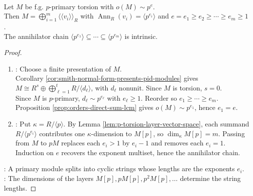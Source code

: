 \begin{theorem} \label{thm:cyclic-decomposition-primary-pid} \\
Let $M$ be f.g. $p$-primary torsion with $o(M)\sim p^e$.\\
Then $M=\bigoplus\limits_{i=1}^m\langle\!\langle v_i\rangle\!\rangle_R$ with $\operatorname{Ann}_R(v_i)=\langle p^{e_i}\rangle$ and $e=e_1\geq e_2\geq\cdots\geq e_m\geq1$.\\
The annihilator chain $\langle p^{e_1}\rangle\subseteq\cdots\subseteq\langle p^{e_m}\rangle$ is intrinsic.
\begin{proof}
\begin{enumerate}[label=(\roman*)]
\setlength{\itemsep}{0pt}
\item {}: Choose a finite presentation of $M$.\\
Corollary \ref{cor:smith-normal-form-presents-pid-modules} gives $M\cong R^s\oplus\bigoplus\limits_{\ell=1}^tR/\langle d_{\ell}\rangle$, with $d_{\ell}$ nonunit. Since $M$ is torsion, $s=0$.\\
Since $M$ is $p$-primary, $d_{\ell}\sim p^{e_{\ell}}$ with $e_{\ell}\geq1$. Reorder so $e_1\geq\cdots\geq e_m$.\\
Proposition \ref{prop:orders-direct-sum-lcm} gives $o(M)\sim p^{e_1}$, hence $e_1=e$.
\item {}: Put $\kappa=R/\langle p\rangle$. By Lemma
\ref{lem:p-torsion-layer-vector-space}, each summand $R/\langle p^{e_i}\rangle$ contributes one $\kappa$-dimension to $M[p]$, so $\dim_{\kappa}M[p]=m$. Passing from $M$ to $pM$ replaces each $e_i>1$ by $e_i-1$ and removes each $e_i=1$.\\
Induction on $e$ recovers the exponent multiset, hence the annihilator chain.
\end{enumerate}
\noindent
{}: A primary module splits into cyclic strings whose lengths are the exponents $e_i$.\\
: The dimensions of the layers $M[p],pM[p],p^2M[p],\ldots$ determine the string lengths.
\end{proof}
\end{theorem}

